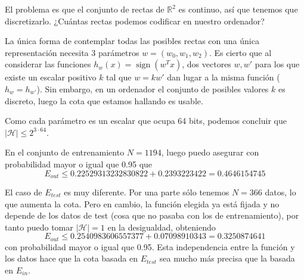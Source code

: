 \documentclass[a4]{article}
\begin{document}
El problema es que el conjunto de rectas de $\mathbb{R}^2$ es
continuo, así que tenemos que discretizarlo.
¿Cuántas rectas podemos codificar en nuestro ordenador?

La única forma de contemplar todas las posibles rectas con una única
representación necesita 3 parámetros $w=(w_0,w_1,w_2)$.
Es cierto que al considerar las funciones $h_w(x)=\operatorname{sign}(w^Tx)$,
dos vectores $w,w'$ para los que existe un escalar positivo $k$ tal que
$w=kw'$ dan lugar a la misma función ($h_w=h_{w'}$). Sin embargo,
en un ordenador el conjunto de posibles valores $k$ es discreto,
luego la cota que estamos hallando es usable.

Como cada parámetro es un escalar que ocupa 64 bits, podemos
concluir que $|\mathcal{H}|\leq 2^{3\cdot 64}$.

En el conjunto de entrenamiento $N=1194$, luego puedo asegurar con probabilidad mayor o igual que 0.95 que
\[E_{out}\leq 0.22529313232830822 + 0.2393223422 = 0.4646154745\]

El caso de $E_{test}$ es muy diferente. Por una parte sólo tenemos
$N=366$ datos, lo que aumenta la cota. Pero en cambio, la función elegida
ya está fijada y no depende de los datos de test (cosa que no pasaba con los
de entrenamiento), por tanto puedo tomar $|\mathcal{H}|=1$ en la desigualdad, obteniendo
\[E_{out}\leq 0.2540983606557377 + 0.07098910343 = 0.3250874641\]
con probabilidad mayor o igual que 0.95. Esta independencia entre la función y
los datos hace que la cota basada en $E_{test}$ sea mucho más precisa que la
basada en $E_{in}$.
\end{document}
